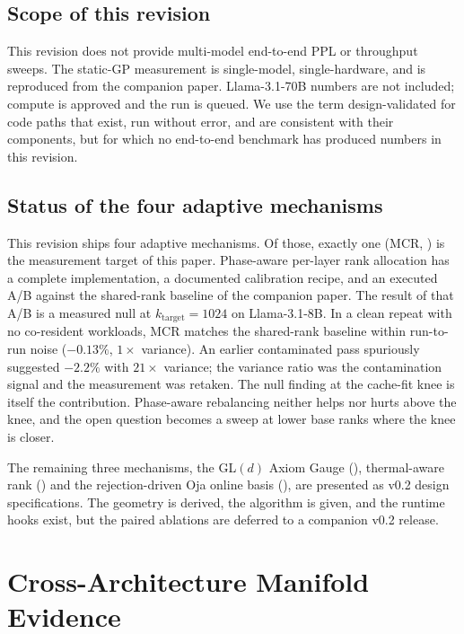 \documentclass[11pt]{article}
\begin{document}
\subsection{Scope of this revision}
This revision does not provide multi-model end-to-end PPL or throughput
sweeps. The static-GP measurement is single-model, single-hardware, and
is reproduced from the companion paper. Llama-3.1-70B numbers are not
included; compute is approved and the run is queued. We use the term
design-validated for code paths that exist, run without error, and are
consistent with their components, but for which no end-to-end benchmark
has produced numbers in this revision.

\subsection{Status of the four adaptive mechanisms}
This revision ships four adaptive mechanisms. Of those, exactly one
(MCR, ) is the measurement target of this paper.
Phase-aware per-layer rank allocation has a complete implementation, a
documented calibration recipe, and an executed A/B against the
shared-rank baseline of the companion paper. The result of that A/B is
a measured null at $k_\text{target}{=}1024$ on Llama-3.1-8B. In a clean
repeat with no co-resident workloads, MCR matches the shared-rank
baseline within run-to-run noise ($-0.13\%$, $1{\times}$ variance). An
earlier contaminated pass spuriously suggested $-2.2\%$ with $21{\times}$
variance; the variance ratio was the contamination signal and the
measurement was retaken. The null finding at the cache-fit knee is
itself the contribution. Phase-aware rebalancing neither helps nor
hurts above the knee, and the open question becomes a sweep at lower
base ranks where the knee is closer.

The remaining three mechanisms, the GL$(d)$ Axiom Gauge
(), thermal-aware rank () and the
rejection-driven Oja online basis (), are presented as
v0.2 design specifications. The geometry is derived, the algorithm is
given, and the runtime hooks exist, but the paired ablations are
deferred to a companion v0.2 release.

\section{Cross-Architecture Manifold Evidence}
\label{sec:manifold}
\end{document}
